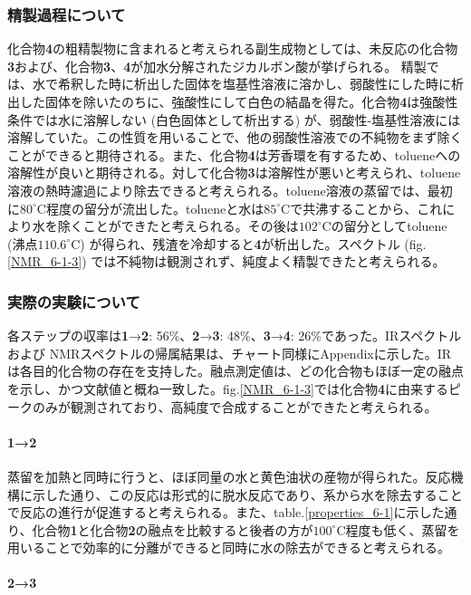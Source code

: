 \documentclass{ltjsarticle}
\theoremstyle{definition}
\numberwithin{equation}{section}
\newcommand{\D}{^\circ\text{C}}
\begin{document}
\subsubsection{精製過程について}
化合物\textbf{4}の粗精製物に含まれると考えられる副生成物としては、未反応の化合物\textbf{3}および、化合物\textbf{3}、\textbf{4}が加水分解されたジカルボン酸が挙げられる。
精製では、水で希釈した時に析出した固体を塩基性溶液に溶かし、弱酸性にした時に析出した固体を除いたのちに、強酸性にして白色の結晶を得た。化合物\textbf{4}は強酸性条件では水に溶解しない (白色固体として析出する) が、弱酸性-塩基性溶液には溶解していた。この性質を用いることで、他の弱酸性溶液での不純物をまず除くことができると期待される。また、化合物\textbf{4}は芳香環を有するため、tolueneへの溶解性が良いと期待される。対して化合物\textbf{3}は溶解性が悪いと考えられ、toluene溶液の熱時濾過により除去できると考えられる。toluene溶液の蒸留では、最初に$80\D$程度の留分が流出した。tolueneと水は$85\D$で共沸する\cite{solvent_bp}ことから、これにより水を除くことができたと考えられる。その後は$102\D$の留分としてtoluene (沸点$110.6\D$) が得られ、残渣を冷却すると\textbf{4}が析出した。スペクトル (fig.\ref{NMR_6-1-3}) では不純物は観測されず、純度よく精製できたと考えられる。

\subsubsection{実際の実験について}
各ステップの収率は\textbf{1}→\textbf{2}: 56\%、\textbf{2}→\textbf{3}: 48\%、\textbf{3}→\textbf{4}: 26\%であった。IRスペクトルおよび NMRスペクトルの帰属結果は、チャート同様にAppendixに示した。IRは各目的化合物の存在を支持した。融点測定値は、どの化合物もほぼ一定の融点を示し、かつ文献値と概ね一致した。fig.\ref{NMR_6-1-3}では化合物\textbf{4}に由来するピークのみが観測されており、高純度で合成することができたと考えられる。

\paragraph{\textbf{1}→\textbf{2}}
蒸留を加熱と同時に行うと、ほぼ同量の水と黄色油状の産物が得られた。反応機構に示した通り、この反応は形式的に脱水反応であり、系から水を除去することで反応の進行が促進すると考えられる。また、table.\ref{properties_6-1}に示した通り、化合物\textbf{1}と化合物\textbf{2}の融点を比較すると後者の方が$100\D$程度も低く、蒸留を用いることで効率的に分離ができると同時に水の除去ができると考えられる。

\paragraph{\textbf{2}→\textbf{3}}
\end{document}
